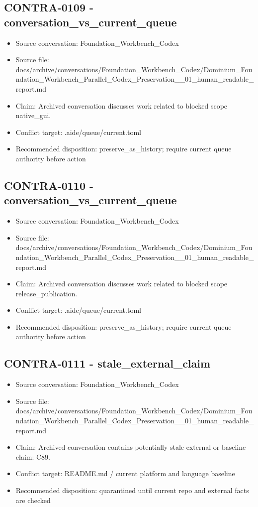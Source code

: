 \documentclass[11pt,a4paper]{report}
\begin{document}
\subsection{CONTRA-0109 - conversation\_vs\_current\_queue}

\begin{itemize}
\item Source conversation: Foundation\_Workbench\_Codex
\item Source file: docs/archive/conversations/Foundation\_Workbench\_Codex/Dominium\_Foundation\_Workbench\_Parallel\_Codex\_Preservation\_\_01\_human\_readable\_report.md
\item Claim: Archived conversation discusses work related to blocked scope native\_gui.
\item Conflict target: .aide/queue/current.toml
\item Recommended disposition: preserve\_as\_history; require current queue authority before action
\end{itemize}

\subsection{CONTRA-0110 - conversation\_vs\_current\_queue}

\begin{itemize}
\item Source conversation: Foundation\_Workbench\_Codex
\item Source file: docs/archive/conversations/Foundation\_Workbench\_Codex/Dominium\_Foundation\_Workbench\_Parallel\_Codex\_Preservation\_\_01\_human\_readable\_report.md
\item Claim: Archived conversation discusses work related to blocked scope release\_publication.
\item Conflict target: .aide/queue/current.toml
\item Recommended disposition: preserve\_as\_history; require current queue authority before action
\end{itemize}

\subsection{CONTRA-0111 - stale\_external\_claim}

\begin{itemize}
\item Source conversation: Foundation\_Workbench\_Codex
\item Source file: docs/archive/conversations/Foundation\_Workbench\_Codex/Dominium\_Foundation\_Workbench\_Parallel\_Codex\_Preservation\_\_01\_human\_readable\_report.md
\item Claim: Archived conversation contains potentially stale external or baseline claim: C89.
\item Conflict target: README.md / current platform and language baseline
\item Recommended disposition: quarantined until current repo and external facts are checked
\end{itemize}
\end{document}
